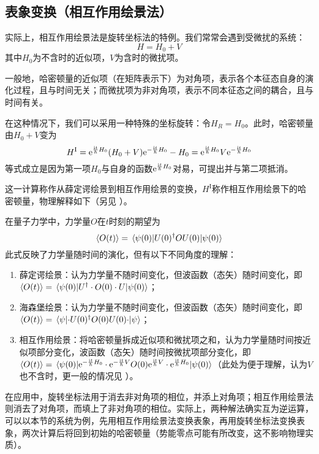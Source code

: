 \documentclass[
fontsetup = font-setup-open.tex,
titlesetup = titles-setup.tex
]{AJbook}
\numberwithin{equation}{section}
\begin{document}
\subsection{表象变换（相互作用绘景法）}
实际上，相互作用绘景法是旋转坐标法的特例。我们常常会遇到受微扰的系统：
\begin{equation}\label{key}
H=H_0+V
\end{equation}
其中$ H_0 $为不含时的近似项，$ V $为含时的微扰项。
\begin{remark}
一般地，哈密顿量的近似项（在矩阵表示下）为对角项，表示各个本征态自身的演化过程，且与时间无关；而微扰项为非对角项，表示不同本征态之间的耦合，且与时间有关。
\end{remark}
在这种情况下，我们可以采用一种特殊的坐标旋转：令$ H_R=H_0 $。此时，哈密顿量由$ H_0+V $变为
\begin{equation}\label{hstohi}
H^\mathrm{I}=\mathrm{e}^{\frac{\mathrm{i}t}{\hbar} H_0}(H_0+V)\mathrm{e}^{-\frac{\mathrm{i}t}{\hbar} H_0}-H_0=\mathrm{e}^{\frac{\mathrm{i}t}{\hbar} H_0}V\mathrm{e}^{-\frac{\mathrm{i}t}{\hbar} H_0}
\end{equation}
等式成立是因为第一项$ H_0 $与自身的函数$ \mathrm{e}^{\frac{\mathrm{i}t}{\hbar} H_0} $对易，可提出并与第二项抵消。

这一计算称作从薛定谔绘景到相互作用绘景的变换，$ H^\mathrm{I} $称作相互作用绘景下的哈密顿量，物理解释如下（另见 \cite{370513302,ctqm}）。
\begin{remark}
在量子力学中，力学量$ O $在$ t $时刻的期望为
\begin{equation}\label{key}
\ev{O(t)}=\ev{U(0)^\dagger OU(0)}{\psi(0)}
\end{equation}
此式反映了力学量随时间的演化，但有以下不同角度的理解：
\begin{enumerate}
\item 薛定谔绘景：认为力学量不随时间变化，但波函数（态矢）随时间变化，即$ \ev{O(t)}=\ev{U^\dagger\cdot O(0)\cdot U}{\psi(0)} $；
\item 海森堡绘景：认为力学量不随时间变化，但波函数（态矢）随时间变化，即$ \ev{O(t)}=\ev{\cdot U(0)^\dagger O(0) U(0)\cdot}{\psi} $；
\item 相互作用绘景：将哈密顿量拆成近似项和微扰项之和，认为力学量随时间按近似项部分变化，波函数（态矢）随时间按微扰项部分变化，即$ \ev{O(t)}=\ev{\enith{H_0}\cdot\enith{V}O(0)\eith{V}\cdot\eith{H_0}}{\psi(0)} $（此处为便于理解，认为$ V $也不含时，更一般的情况见 \cite{370513302}）。
\end{enumerate}
\end{remark}
在应用中，旋转坐标法用于消去非对角项的相位，并添上对角项；相互作用绘景法则消去了对角项，而填上了非对角项的相位。实际上，两种解法确实互为逆运算，可以以本节的系统为例，先用相互作用绘景法变换表象，再用旋转坐标法变换表象，两次计算后将回到初始的哈密顿量（势能零点可能有所改变，这不影响物理实质）。
\end{document}
